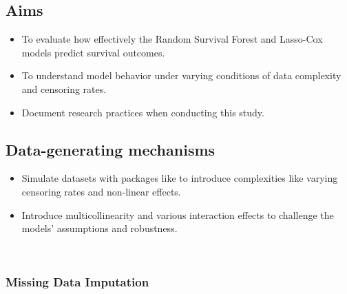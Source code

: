 \subsection{Aims}
\begin{itemize}
\item To evaluate how effectively the Random Survival Forest and Lasso-Cox models predict survival outcomes.
\item To understand model behavior under varying conditions of data complexity and censoring rates.
\item Document research practices when conducting this study.
\end{itemize}

\subsection{Data-generating mechanisms}
\begin{itemize}
\item Simulate datasets with packages like \parencite{davidson-pilon_lifelines_2024} to introduce complexities like varying censoring rates and non-linear effects.
\item Introduce multicollinearity and various interaction effects to challenge the models' assumptions and robustness.
\end{itemize}
\
\subsubsection*{Missing Data Imputation}

